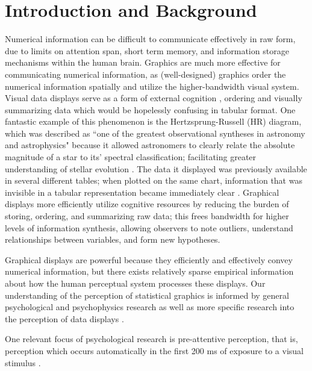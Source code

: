 \documentclass[12pt]{article}\usepackage[]{graphicx}\usepackage[]{color}
\begin{document}
\newpage
{} %

\tableofcontents
\newpage
\section{Introduction and Background}
Numerical information can be difficult to communicate effectively in raw form, due to limits on attention span, short term memory, and information storage mechanisms within the human brain. 
Graphics are much more effective for communicating numerical information, as (well-designed) graphics order the numerical information spatially and utilize the higher-bandwidth visual system. 
Visual data displays serve as a form of external cognition \citep{zhang1997nature,scaife1996external}, ordering and visually summarizing data which would be hopelessly confusing in tabular format. 
One fantastic example of this phenomenon is the Hertzsprung-Russell (HR) diagram, which was described as ``one of the greatest observational syntheses in astronomy and astrophysics" because it allowed astronomers to clearly relate the absolute magnitude of a star to its' spectral classification; facilitating greater understanding of stellar evolution \citep{spence1993remarkable}. 
The data it displayed was previously available in several different tables; when plotted on the same chart, information that was invisible in a tabular representation became immediately clear \citep{lewandowsky1989perception}. 
Graphical displays more efficiently utilize cognitive resources by reducing the burden of storing, ordering, and summarizing raw data; this frees bandwidth for higher levels of information synthesis, allowing observers to note outliers, understand relationships between variables, and form new hypotheses.

Graphical displays are powerful because they efficiently and effectively convey numerical information, but there exists  relatively sparse empirical information about how the human perceptual system processes these displays. Our understanding of the perception of statistical graphics is informed by general psychological and psychophysics research as well as more specific research into the perception of data displays \citep{cleveland:1984}. 

One relevant focus of psychological research is pre-attentive perception, that is, perception which occurs automatically in the first 200 ms of exposure to a visual stimulus \citep{treisman1985preattentive}. 
\end{document}
